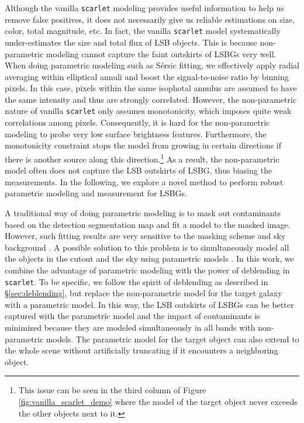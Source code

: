 \documentclass[twocolumn,astrosymb,twocolappendix]{aastex631}
\newcommand{\code}[1]{\texttt{#1}}
\newcommand{\sersic}{S\'ersic}
\begin{document}
\begin{CJK*}{UTF8}{gbsn}
Although the vanilla \code{scarlet} modeling provides useful information to help us remove false positives, it does not necessarily give us reliable estimations on size, color, total magnitude, etc. In fact, the vanilla \code{scarlet} model systematically under-estimates the size and total flux of LSB objects. 
This is because non-parametric modeling cannot capture the faint outskirts of LSBGs very well. When doing parametric modeling such as \sersic{} fitting, we effectively apply radial averaging within elliptical annuli and boost the signal-to-noise ratio by binning pixels. In this case, pixels within the same isophotal annulus are assumed to have the same intensity and thus are strongly correlated. However, the non-parametric nature of vanilla \code{scarlet} only assumes monotonicity, which imposes quite weak correlations among pixels. Consequently, it is hard for the non-parametric modeling to probe very low surface brightness features. Furthermore, the monotonicity constraint stops the model from growing in certain directions if there is another source along this direction.\footnote{This issue can be seen in the third column of Figure \ref{fig:vanilla_scarlet_demo} where the model of the target object never exceeds the other objects next to it.} As a result, the non-parametric model often does not capture the LSB outskirts of LSBG, thus biasing the measurements. In the following, we explore a novel method to perform robust parametric modeling and measurement for LSBGs.

A traditional way of doing parametric modeling is to mask out contaminants based on the detection segmentation map and fit a model to the masked image. However, such fitting results are very sensitive to the masking scheme and sky background \citep[e.g.,][]{Greco2018}. A possible solution to this problem is to simultaneously model all the objects in the cutout and the sky using parametric models \citep[e.g.,][]{Lang2016,Dey2019}. In this work, we combine the advantage of parametric modeling with the power of deblending in \code{scarlet}. To be specific, we follow the spirit of deblending as described in \S\ref{sec:deblending}, but replace the non-parametric model for the target galaxy with a parametric model. In this way, the LSB outskirts of LSBGs can be better captured with the parametric model and the impact of contaminants is minimized because they are modeled simultaneously in all bands with non-parametric models. The parametric model for the target object can also extend to the whole scene without artificially truncating if it encounters a neighboring object. 


\end{CJK*}
\end{document}
